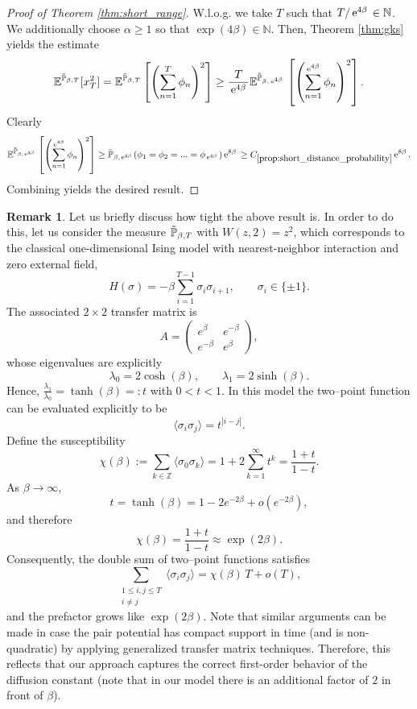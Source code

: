 \documentclass[reqno,11pt]{amsart}
\newcommand{\1}{\mathds{1}}
\theoremstyle{plain}
\theoremstyle{definition}
\newtheorem{remark}[theorem]{Remark}
\numberwithin{equation}{section}
\newcommand{\e}[1]{\,{\rm e}^{#1}\,}
\newcommand{\bbE}{{\mathbb E}}
\newcommand{\bbN}{{\mathbb N}}
\newcommand{\bbP}{{\mathbb P}}
\newcommand{\bbPw}{\Tilde{\bbP}}
\def\lt{\left}
\def\rt{\right}
\begin{document}
\begin{proof}[Proof of Theorem \ref{thm:short_range}]
    W.l.o.g. we take $T$ such that $T / \e{4\beta} \in \bbN$. We additionally choose $\alpha \ge 1 $ so that $\exp(4\beta) \in \bbN$. Then, Theorem \ref{thm:gks} yields the estimate
    $$\bbE^{\bbPw_{\beta,T}} [ x_T ^2] =\bbE^{\bbPw_{\beta,T}} \lt[ \lt( \sum\limits_{n=1} ^T \phi_n \rt) ^2 \rt] \ge \frac{T}{\e{4\beta}} \bbE^{\bbPw_{\beta,\e{4\beta}}} \lt[ \lt( \sum\limits_{n=1} ^{\e{4\beta}} \phi_n \rt) ^2 \rt].$$
    Clearly
    $$\bbE^{\bbPw_{\beta,\e{4\beta}}} \lt[ \lt( \sum\limits_{n=1} ^{\e{4\beta}} \phi_n \rt) ^2 \rt] \ge \bbPw_{\beta,\e{4\beta}}(\phi_1 = \phi_{2} =...= \phi_{\e{4\beta}}) \e{8\beta} \ge C_{\ref{prop:short_distance_probability}} \e{8 \beta}.$$
    Combining yields the desired result.
\end{proof}


\begin{remark}
    Let us briefly discuss how tight the above result is. In order to do this, let us consider the measure $\bbPw_{\beta,T}$ with $W(z,2) = z^2$, which corresponds to the classical one-dimensional Ising model
with nearest-neighbor interaction and zero external field,
\[
H(\sigma) = - \beta \sum_{i=1}^{T-1} \sigma_i \sigma_{i+1},
\qquad \sigma_i \in \{\pm 1\}.
\]
The associated $2\times 2$ transfer matrix is
\[
A=\begin{pmatrix}
e^{\beta } & e^{-\beta } \\
e^{-\beta } & e^{\beta }
\end{pmatrix},
\]
whose eigenvalues are explicitly
\[
\lambda_0 = 2\cosh(\beta ),
\qquad 
\lambda_1 = 2\sinh(\beta ).
\]
Hence,
$\frac{\lambda_1}{\lambda_0} = \tanh(\beta ) =: t$ with
$0 < t < 1$.
In this model the two–point function can be evaluated explicitly to be
\[
\langle \sigma_i \sigma_j\rangle = t^{|i-j|}.
\]
Define the susceptibility
\[
\chi(\beta) 
:= \sum_{k\in\mathbb{Z}} 
\langle \sigma_0 \sigma_k\rangle 
= 1 + 2\sum_{k=1}^\infty t^k
= \frac{1+t}{1-t}.
\]
As $\beta\to\infty$,
\[
t = \tanh(\beta )
= 1 - 2 e^{-2\beta } + o(e^{-2\beta }),
\]
and therefore
\[
\chi(\beta) 
= \frac{1+t}{1-t}
\approx \exp(2\beta ).
\]
Consequently, the double sum of two–point functions satisfies
\[
\sum_{\substack{1\le i,j\le T\\ i\neq j}}
\langle \sigma_i \sigma_j\rangle
= \chi(\beta)\,T + o(T),
\]
and the prefactor grows like $\exp(2\beta )$. Note that similar arguments can be made in case the pair potential has compact support in time (and is non-quadratic) by applying generalized transfer matrix techniques. Therefore,
this reflects that our approach captures the correct first-order behavior of the diffusion constant (note that in our model there is an additional factor of $2$ in front of $\beta$).
\end{remark}
\end{document}
